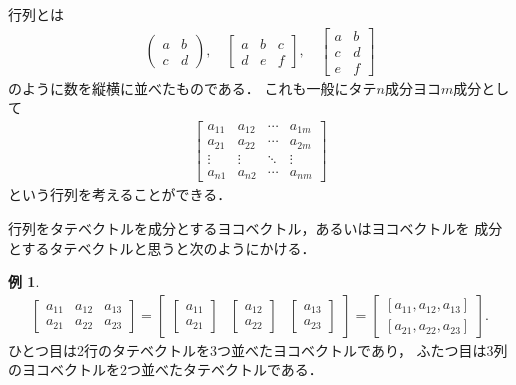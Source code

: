 \documentclass[11pt, a4paper, dvipdfmx]{jsarticle}
\theoremstyle{definition}
\newtheorem{Example}[Axiom]{例}
\newcommand{\e}{\varepsilon} %
\theoremstyle{mystyle}
\numberwithin{equation}{section} %
\begin{document}
行列とは
\begin{align*}
    \begin{pmatrix}
        a&b\\c&d
    \end{pmatrix},\quad
    \begin{bmatrix}
        a&b&c\\d&e&f
    \end{bmatrix},\quad
    \begin{bmatrix}
        a&b\\c&d\\e&f
    \end{bmatrix}
\end{align*}
のように数を縦横に並べたものである．
これも一般にタテ$n$成分ヨコ$m$成分として
\begin{align*}
    \begin{bmatrix}
        a_{11}&a_{12}&\cdots&a_{1m}\\
        a_{21}&a_{22}&\cdots&a_{2m}\\
        \vdots&\vdots&\ddots&\vdots\\
        a_{n1}&a_{n2}&\cdots&a_{nm}
    \end{bmatrix}
\end{align*}
という行列を考えることができる．

行列をタテベクトルを成分とするヨコベクトル，あるいはヨコベクトルを
成分とするタテベクトルと思うと次のようにかける．

\begin{Example}
    \begin{align*}
        \begin{bmatrix}
            a_{11}&a_{12}&a_{13}\\
            a_{21}&a_{22}&a_{23}
        \end{bmatrix}
        =\begin{bmatrix}
            \begin{bmatrix}
               a_{11}\\a_{21}
            \end{bmatrix}&\begin{bmatrix}
               a_{12}\\a_{22} 
            \end{bmatrix}&\begin{bmatrix}
               a_{13}\\a_{23}
            \end{bmatrix}   
        \end{bmatrix}
        =\begin{bmatrix}
            [a_{11},a_{12},a_{13}]\\
            [a_{21},a_{22},a_{23}]
        \end{bmatrix}.
    \end{align*}
    ひとつ目は2行のタテベクトルを3つ並べたヨコベクトルであり，
    ふたつ目は3列のヨコベクトルを2つ並べたタテベクトルである．
\end{Example}
\end{document}
